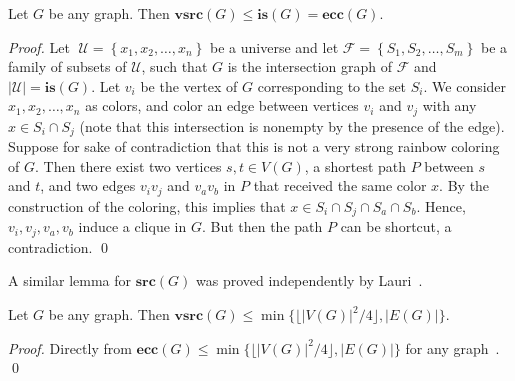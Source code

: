 \documentclass[letter,runningheads,envcountsame,envcountsect]{llncs}
\newcommand{\U}{\mathcal{U}}
\newcommand{\F}{\mathcal{F}}
\newcommand{\vsrc}{\mathbf{vsrc}}
\newcommand{\src}{\mathbf{src}}
\newcommand{\isn}{\mathbf{is}}
\newcommand{\ecc}{\mathbf{ecc}}
\begin{document}
\begin{lemma}
	\label{lemma:intersection}
Let $G$ be any graph. Then $\vsrc(G) \leq \isn(G) = \ecc(G)$.
\end{lemma}
\begin{proof}
Let $\;\U=\left\{ x_1,x_2,\dots, x_n \right\}$ be a universe and let $\F=\left\{ S_1,S_2,\dots,S_m \right\}$ be a family of subsets of $\U$, such that $G$ is the intersection graph of $\F$ and $|\U| = \isn(G)$. Let $v_i$ be the vertex of $G$ corresponding to the set $S_i$. We consider $x_1, x_2, \dots, x_n$ as colors, and color an edge between vertices $v_i$ and $v_j$ with any $x \in S_i \cap S_j$ (note that this intersection is nonempty by the presence of the edge). Suppose for sake of contradiction that this is not a very strong rainbow coloring of $G$. Then there exist two vertices $s,t \in V(G)$, a shortest path $P$ between $s$ and $t$, and two edges $v_iv_j$ and $v_av_b$ in $P$ that received the same color $x$. By the construction of the coloring, this implies that $x\in S_i\cap S_j\cap S_a\cap S_b$. Hence, $v_i,v_j,v_a,v_b$ induce a clique in $G$. But then the path $P$ can be shortcut, a contradiction.
\qed\end{proof}
A similar lemma for $\src(G)$ was proved independently by Lauri~\cite[Prop.~5.3]{lauri2016chasing}.
%

\begin{corollary}
Let $G$ be any graph. Then $\vsrc(G) \leq \min\{\lfloor |V(G)|^2/4 \rfloor, |E(G)|\}$.
\end{corollary}
\begin{proof}
Directly from $\ecc(G)\leq \min\{\lfloor |V(G)|^2/4 \rfloor, |E(G)|\}$ for any graph~\cite{erdos1966representation}.
\qed\end{proof}

\end{document}
